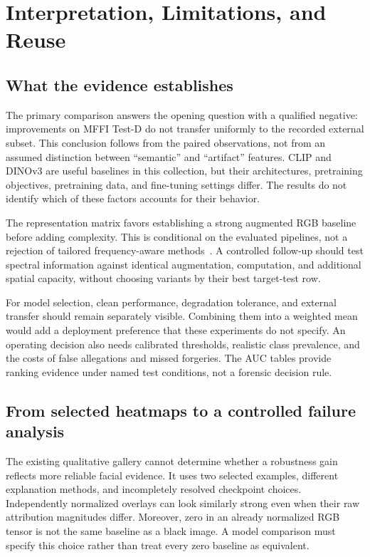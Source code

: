 \documentclass[conference,10pt,letterpaper]{IEEEtran}
\begin{document}
\section{Interpretation, Limitations, and Reuse}
\subsection{What the evidence establishes}
The primary comparison answers the opening question with a qualified negative: improvements on MFFI Test-D do not transfer uniformly to the recorded external subset. This conclusion follows from the paired observations, not from an assumed distinction between ``semantic'' and ``artifact'' features. CLIP and DINOv3 are useful baselines in this collection, but their architectures, pretraining objectives, pretraining data, and fine-tuning settings differ. The results do not identify which of these factors accounts for their behavior.

The representation matrix favors establishing a strong augmented RGB baseline before adding complexity. This is conditional on the evaluated pipelines, not a rejection of tailored frequency-aware methods~\cite{kashiani2025}. A controlled follow-up should test spectral information against identical augmentation, computation, and additional spatial capacity, without choosing variants by their best target-test row.

For model selection, clean performance, degradation tolerance, and external transfer should remain separately visible. Combining them into a weighted mean would add a deployment preference that these experiments do not specify. An operating decision also needs calibrated thresholds, realistic class prevalence, and the costs of false allegations and missed forgeries. The AUC tables provide ranking evidence under named test conditions, not a forensic decision rule.

\subsection{From selected heatmaps to a controlled failure analysis}
\label{sec:explanations}
The existing qualitative gallery cannot determine whether a robustness gain reflects more reliable facial evidence. It uses two selected examples, different explanation methods, and incompletely resolved checkpoint choices. Independently normalized overlays can look similarly strong even when their raw attribution magnitudes differ. Moreover, zero in an already normalized RGB tensor is not the same baseline as a black image. A model comparison must specify this choice rather than treat every zero baseline as equivalent.
\end{document}
